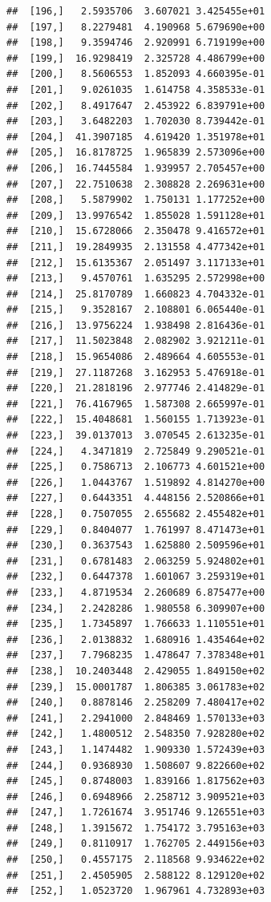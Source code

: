 \documentclass[article]{jss}\usepackage[]{graphicx}\usepackage[]{xcolor}
\makeatletter
\newenvironment{kframe}{%
 \def\at@end@of@kframe{}%
 \ifinner\ifhmode%
  \def\at@end@of@kframe{\end{minipage}}%
  \begin{minipage}{\columnwidth}%
 \fi\fi%
 \def\FrameCommand##1{\hskip\@totalleftmargin \hskip-\fboxsep
 \colorbox{shadecolor}{##1}\hskip-\fboxsep
     \hskip-\linewidth \hskip-\@totalleftmargin \hskip\columnwidth}%
 \MakeFramed {\advance\hsize-\width
   \@totalleftmargin\z@ \linewidth\hsize
   \@setminipage}}%
 {\par\unskip\endMakeFramed%
 \at@end@of@kframe}
\newenvironment{knitrout}{}{} %
\makeatother
\begin{document}
\begin{knitrout}
\begin{kframe}
\begin{verbatim}
##  [196,]   2.5935706  3.607021 3.425455e+01
##  [197,]   8.2279481  4.190968 5.679690e+00
##  [198,]   9.3594746  2.920991 6.719199e+00
##  [199,]  16.9298419  2.325728 4.486799e+00
##  [200,]   8.5606553  1.852093 4.660395e-01
##  [201,]   9.0261035  1.614758 4.358533e-01
##  [202,]   8.4917647  2.453922 6.839791e+00
##  [203,]   3.6482203  1.702030 8.739442e-01
##  [204,]  41.3907185  4.619420 1.351978e+01
##  [205,]  16.8178725  1.965839 2.573096e+00
##  [206,]  16.7445584  1.939957 2.705457e+00
##  [207,]  22.7510638  2.308828 2.269631e+00
##  [208,]   5.5879902  1.750131 1.177252e+00
##  [209,]  13.9976542  1.855028 1.591128e+01
##  [210,]  15.6728066  2.350478 9.416572e+01
##  [211,]  19.2849935  2.131558 4.477342e+01
##  [212,]  15.6135367  2.051497 3.117133e+01
##  [213,]   9.4570761  1.635295 2.572998e+00
##  [214,]  25.8170789  1.660823 4.704332e-01
##  [215,]   9.3528167  2.108801 6.065440e-01
##  [216,]  13.9756224  1.938498 2.816436e-01
##  [217,]  11.5023848  2.082902 3.921211e-01
##  [218,]  15.9654086  2.489664 4.605553e-01
##  [219,]  27.1187268  3.162953 5.476918e-01
##  [220,]  21.2818196  2.977746 2.414829e-01
##  [221,]  76.4167965  1.587308 2.665997e-01
##  [222,]  15.4048681  1.560155 1.713923e-01
##  [223,]  39.0137013  3.070545 2.613235e-01
##  [224,]   4.3471819  2.725849 9.290521e-01
##  [225,]   0.7586713  2.106773 4.601521e+00
##  [226,]   1.0443767  1.519892 4.814270e+00
##  [227,]   0.6443351  4.448156 2.520866e+01
##  [228,]   0.7507055  2.655682 2.455482e+01
##  [229,]   0.8404077  1.761997 8.471473e+01
##  [230,]   0.3637543  1.625880 2.509596e+01
##  [231,]   0.6781483  2.063259 5.924802e+01
##  [232,]   0.6447378  1.601067 3.259319e+01
##  [233,]   4.8719534  2.260689 6.875477e+00
##  [234,]   2.2428286  1.980558 6.309907e+00
##  [235,]   1.7345897  1.766633 1.110551e+01
##  [236,]   2.0138832  1.680916 1.435464e+02
##  [237,]   7.7968235  1.478647 7.378348e+01
##  [238,]  10.2403448  2.429055 1.849150e+02
##  [239,]  15.0001787  1.806385 3.061783e+02
##  [240,]   0.8878146  2.258209 7.480417e+02
##  [241,]   2.2941000  2.848469 1.570133e+03
##  [242,]   1.4800512  2.548350 7.928280e+02
##  [243,]   1.1474482  1.909330 1.572439e+03
##  [244,]   0.9368930  1.508607 9.822660e+02
##  [245,]   0.8748003  1.839166 1.817562e+03
##  [246,]   0.6948966  2.258712 3.909521e+03
##  [247,]   1.7261674  3.951746 9.126551e+03
##  [248,]   1.3915672  1.754172 3.795163e+03
##  [249,]   0.8110917  1.762705 2.449156e+03
##  [250,]   0.4557175  2.118568 9.934622e+02
##  [251,]   2.4505905  2.588122 8.129120e+02
##  [252,]   1.0523720  1.967961 4.732893e+03

\end{verbatim}
\end{kframe}
\end{knitrout}
\end{document}
